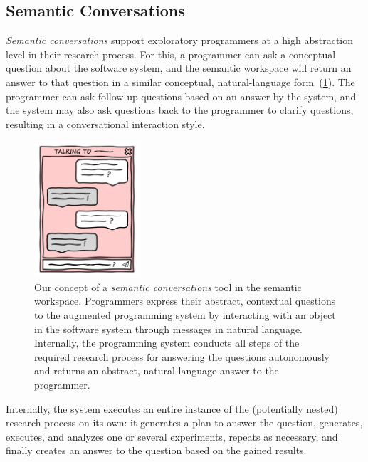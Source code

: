 
\subsection{Semantic Conversations}
\label{sec:approach/workspace/conversations}

\emph{Semantic conversations} support exploratory programmers at a high abstraction level in their research process.
For this, a programmer can ask a conceptual question about the software system, and the semantic workspace will return an answer to that question in a similar conceptual, natural-language form~(\cref{fig:approach/workspace/conversation}).
The programmer can ask follow-up questions based on an answer by the system, and the system may also ask questions back to the programmer to clarify questions, resulting in a conversational interaction style.

\begin{figure}
	\centering
	\includegraphics[width=0.35\textwidth]{02_workspace/conversation.png}
	\caption[Our concept of a \emph{semantic conversations} tool in the semantic workspace.]{
		Our concept of a \emph{semantic conversations} tool in the semantic workspace.
		Programmers express their abstract, contextual questions to the augmented programming system by interacting with an object in the software system through messages in natural language.
		Internally, the programming system conducts all steps of the required research process for answering the questions autonomously and returns an abstract, natural-language answer to the programmer.
	}
	\label{fig:approach/workspace/conversation}
\end{figure}

Internally, the system executes an entire instance of the (potentially nested) research process on its own: it generates a plan to answer the question, generates, executes, and analyzes one or several experiments, repeats as necessary, and finally creates an answer to the question based on the gained results.

